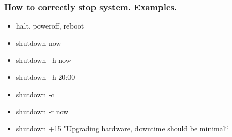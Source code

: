 \begin{frame}[fragile]
\frametitle{How to correctly stop system. Examples.}
    \begin{itemize}       
        \item halt, poweroff, reboot
        \item shutdown now
        \item shutdown –h now
        \item shutdown –h 20:00
        \item shutdown -c
        \item shutdown -r now
        \item shutdown +15 "Upgrading hardware, downtime should be minimal“
    \end{itemize}
\end{frame}

